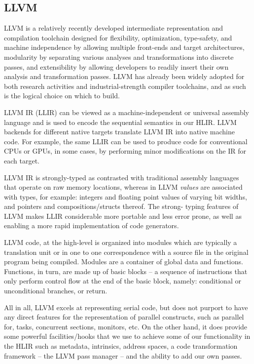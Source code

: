 \documentclass[12pt]{article}
\begin{document}
\subsection{LLVM}

LLVM is a relatively recently developed intermediate representation and compilation toolchain designed for flexibility, optimization, type-safety, and machine independence by allowing multiple front-ends and target architectures, modularity by separating various analyses and transformations into discrete passes, and extensibility by allowing developers to readily insert their own analysis and transformation passes. LLVM has already been widely adopted for both research activities and industrial-strength compiler toolchains, and as such is the logical choice on which to build.

LLVM IR (LLIR) can be viewed as a machine-independent or universal assembly language and is used to encode the sequential semantics in our HLIR. LLVM backends for different native targets translate LLVM IR into native machine code. For example, the same LLIR can be used to produce code for conventional CPUs or GPUs, in some cases, by performing minor modifications on the IR for each target.

LLVM IR is strongly-typed as contrasted with traditional assembly languages that operate on raw memory locations, whereas in LLVM {\it values} are associated with types, for example: integers and floating point values of varying bit widths, and pointers and compositions/structs thereof. The strong- typing features of LLVM makes LLIR considerable more portable and less error prone, as well as enabling a more rapid implementation of code generators.

LLVM code, at the high-level is organized into modules which are typically a translation unit or in one to one correspondence with a source file in the original program being compiled. Modules are a container of global data and functions. Functions, in turn, are made up of basic blocks -- a sequence of instructions that only perform control flow at the end of the basic block, namely: conditional or unconditional branches, or return.

All in all, LLVM excels at representing serial code, but does not purport to have any direct features for the representation of parallel constructs, such as parallel for, tasks, concurrent sections, monitors, etc. On the other hand, it does provide some powerful facilities/hooks that we use to achieve some of our functionality in the HLIR such as metadata, intrinsics, address spaces, a code transformation framework -- the LLVM pass manager -- and the ability to add our own passes.
\end{document}
